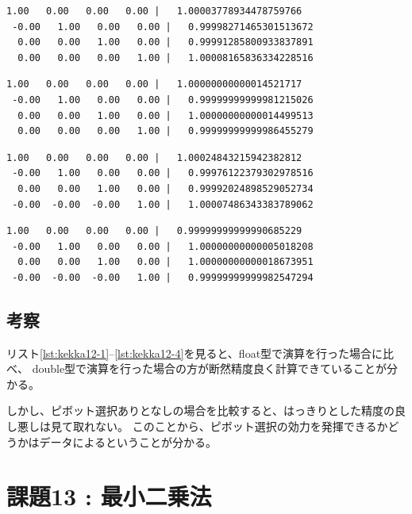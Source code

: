 \documentclass[a4j,titlepage]{jsarticle}
\begin{document}
\begin{lstlisting}[style=text,caption=ピボット選択なし/float型の実行結果,label=lst:kekka12-1]
  1.00   0.00   0.00   0.00 |   1.00003778934478759766
 -0.00   1.00   0.00   0.00 |   0.99998271465301513672
  0.00   0.00   1.00   0.00 |   0.99991285800933837891
  0.00   0.00   0.00   1.00 |   1.00008165836334228516
\end{lstlisting}

\begin{lstlisting}[style=text,caption=ピボット選択なし/double型の実行結果,label=lst:kekka12-2]
  1.00   0.00   0.00   0.00 |   1.00000000000014521717
 -0.00   1.00   0.00   0.00 |   0.99999999999981215026
  0.00   0.00   1.00   0.00 |   1.00000000000014499513
  0.00   0.00   0.00   1.00 |   0.99999999999986455279
\end{lstlisting}

\begin{lstlisting}[style=text,caption=ピボット選択あり/float型の実行結果,label=lst:kekka12-3]
  1.00   0.00   0.00   0.00 |   1.00024843215942382812
 -0.00   1.00   0.00   0.00 |   0.99976122379302978516
  0.00   0.00   1.00   0.00 |   0.99992024898529052734
 -0.00  -0.00  -0.00   1.00 |   1.00007486343383789062
\end{lstlisting}

\begin{lstlisting}[style=text,caption=ピボット選択あり/double型の実行結果,label=lst:kekka12-4]
  1.00   0.00   0.00   0.00 |   0.99999999999990685229
 -0.00   1.00   0.00   0.00 |   1.00000000000005018208
  0.00   0.00   1.00   0.00 |   1.00000000000018673951
 -0.00  -0.00  -0.00   1.00 |   0.99999999999982547294
\end{lstlisting}

\subsection{考察}
リスト\ref{lst:kekka12-1}--\ref{lst:kekka12-4}を見ると、float型で演算を行った場合に比べ、
double型で演算を行った場合の方が断然精度良く計算できていることが分かる。

しかし、ピボット選択ありとなしの場合を比較すると、はっきりとした精度の良し悪しは見て取れない。
このことから、ピボット選択の効力を発揮できるかどうかはデータによるということが分かる。


\section{課題13 : 最小二乗法}
\end{document}
